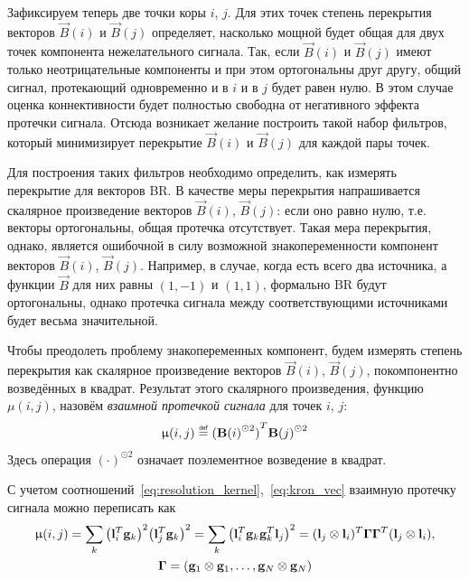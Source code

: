 Зафиксируем теперь две точки коры $i$, $j$. Для этих точек степень перекрытия
векторов $\vec{B}(i)$ и $\vec{B}(j)$ определяет, насколько мощной будет общая
для двух точек компонента нежелательного сигнала. Так, если $\vec{B}(i)$ и
$\vec{B}(j)$ имеют только неотрицательные компоненты и при этом ортогональны
друг другу, общий сигнал, протекающий одновременно и в $i$ и в $j$ будет равен
нулю. В этом случае оценка коннективности будет полностью свободна от
негативного эффекта протечки сигнала. Отсюда возникает желание построить такой
набор фильтров, который минимизирует перекрытие $\vec{B}(i)$ и $\vec{B}(j)$ для
каждой пары точек.

Для построения таких фильтров необходимо определить, как измерять перекрытие
для векторов BR. В качестве меры перекрытия напрашивается скалярное
произведение векторов $\vec{B}(i)$, $\vec{B}(j)$: если оно равно нулю, т.е.
векторы ортогональны, общая протечка отсутствует. Такая мера перекрытия,
однако, является ошибочной в силу возможной знакопеременности компонент
векторов $\vec{B}(i)$, $\vec{B}(j)$. Например, в случае, когда есть всего два
источника, а функции $\vec{B}$ для них равны $(1, -1)$ и $(1, 1)$, формально BR
будут ортогональны, однако протечка сигнала между соответствующими источниками
будет весьма значительной.

Чтобы преодолеть проблему знакопеременных компонент, будем измерять степень
перекрытия как скалярное произведение векторов $\vec{B}(i)$, $\vec{B}(j)$,
покомпонентно возведённых в квадрат. Результат
этого скалярного произведения, функцию $\mu(i, j)$, назовём \emph{взаимной
протечкой сигнала} для точек $i$, $j$:
\begin{equation}
    \mu(i, j) \defeq {(\vec{B}{(i)}^{\odot 2})}^T \vec{B}{(j)}^{\odot 2}
    \label{eq:def_mutual_leakage}
\end{equation}
Здесь операция ${(\cdot)}^{\odot 2}$ означает поэлементное возведение в квадрат.

С учетом соотношений~\ref{eq:resolution_kernel},~\ref{eq:kron_vec} взаимную протечку сигнала можно переписать как
\begin{multline}
    \upmu(i, j)= \sum_k {\left(\mathbf{l}_i^T \mathbf{g}_k\right)}^2{\left(\mathbf{l}_j^T \mathbf{g}_k\right)}^2=
    \sum_k\left(\mathbf{l}_i^T \mathbf{g}_k\mathbf{g}_k^T \mathbf{l}_j\right)^2=(\mathbf{l}_j \otimes \mathbf{l}_i)^T \mathbf{\Gamma} \mathbf{\Gamma}^T(\mathbf{l}_j \otimes \mathbf{l}_i),\\
    \mathbf{\Gamma} = (\mathbf{g}_1 \otimes \mathbf{g}_1, \ldots, \mathbf{g}_N \otimes \mathbf{g}_N)
\end{multline}

